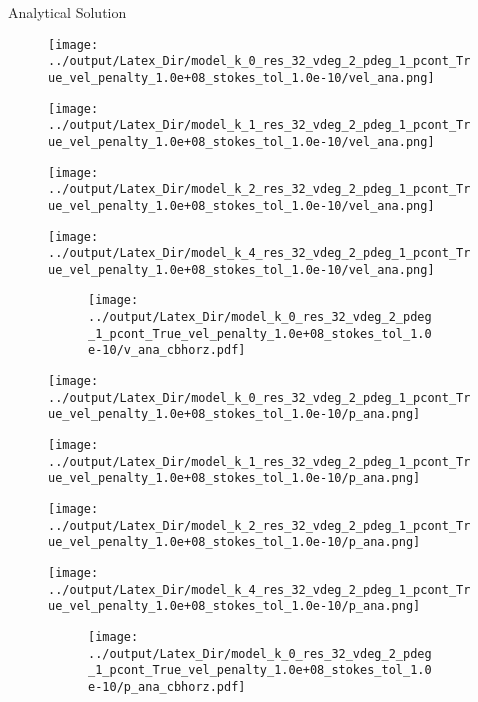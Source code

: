 \documentclass[10pt,aspectratio=169]{beamer}
\begin{document}
\begin{frame}{Analytical Solution}
	\vspace{-0.32in}
	\begin{figure}[!htb]
		\begin{multicols}{4}
			\texttt{[image: ../output/Latex\_Dir/model\_k\_0\_res\_32\_vdeg\_2\_pdeg\_1\_pcont\_True\_vel\_penalty\_1.0e+08\_stokes\_tol\_1.0e-10/vel\_ana.png]}\par
			\hspace{0.75in}
			\texttt{[image: ../output/Latex\_Dir/model\_k\_1\_res\_32\_vdeg\_2\_pdeg\_1\_pcont\_True\_vel\_penalty\_1.0e+08\_stokes\_tol\_1.0e-10/vel\_ana.png]}\par
			\hspace{1.5in}
			\texttt{[image: ../output/Latex\_Dir/model\_k\_2\_res\_32\_vdeg\_2\_pdeg\_1\_pcont\_True\_vel\_penalty\_1.0e+08\_stokes\_tol\_1.0e-10/vel\_ana.png]}\par
			\hspace{2.25in}
			\texttt{[image: ../output/Latex\_Dir/model\_k\_4\_res\_32\_vdeg\_2\_pdeg\_1\_pcont\_True\_vel\_penalty\_1.0e+08\_stokes\_tol\_1.0e-10/vel\_ana.png]}
		\end{multicols}
		\vspace{-0.29in}
		\begin{figure}
			\hspace{0.1in} 
			\texttt{[image: ../output/Latex\_Dir/model\_k\_0\_res\_32\_vdeg\_2\_pdeg\_1\_pcont\_True\_vel\_penalty\_1.0e+08\_stokes\_tol\_1.0e-10/v\_ana\_cbhorz.pdf]}
		\end{figure}
	\end{figure}
	
	\begin{figure}[!htb]
		\vspace{-0.5in}
		\begin{multicols}{4}
			\texttt{[image: ../output/Latex\_Dir/model\_k\_0\_res\_32\_vdeg\_2\_pdeg\_1\_pcont\_True\_vel\_penalty\_1.0e+08\_stokes\_tol\_1.0e-10/p\_ana.png]}\par
			\hspace{0.75in}
			\texttt{[image: ../output/Latex\_Dir/model\_k\_1\_res\_32\_vdeg\_2\_pdeg\_1\_pcont\_True\_vel\_penalty\_1.0e+08\_stokes\_tol\_1.0e-10/p\_ana.png]}\par
			\hspace{1.5in}
			\texttt{[image: ../output/Latex\_Dir/model\_k\_2\_res\_32\_vdeg\_2\_pdeg\_1\_pcont\_True\_vel\_penalty\_1.0e+08\_stokes\_tol\_1.0e-10/p\_ana.png]}\par
			\hspace{2.25in}
			\texttt{[image: ../output/Latex\_Dir/model\_k\_4\_res\_32\_vdeg\_2\_pdeg\_1\_pcont\_True\_vel\_penalty\_1.0e+08\_stokes\_tol\_1.0e-10/p\_ana.png]}
		\end{multicols}
		\vspace{-0.27in}
		\begin{figure}
			\hspace{0.1in} 
			\texttt{[image: ../output/Latex\_Dir/model\_k\_0\_res\_32\_vdeg\_2\_pdeg\_1\_pcont\_True\_vel\_penalty\_1.0e+08\_stokes\_tol\_1.0e-10/p\_ana\_cbhorz.pdf]}
		\end{figure}
	\end{figure}
\end{frame}
\end{document}
